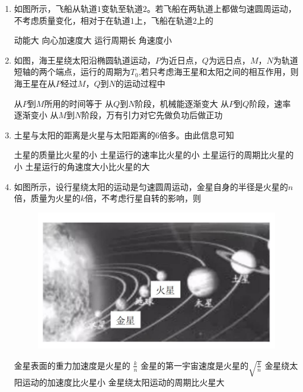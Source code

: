 \begin{enumerate}[leftmargin=0em]
\item 
{}
如图所示，飞船从轨道$ 1 $变轨至轨道$ 2 $。若飞船在两轨道上都做匀速圆周运动，不考虑质量变化，相对于在轨道$ 1 $上，飞船在轨道$ 2 $上的  
\begin{figure}[h!]
\centering

\end{figure}

\fourchoices
{动能大}
{向心加速度大}
{运行周期长}
{角速度小}



\item 
{}
如图，海王星绕太阳沿椭圆轨道运动，$ P $为近日点，$ Q $为远日点，$ M $，$ N $为轨道短轴的两个端点，运行的周期为$ T_{0} $,若只考虑海王星和太阳之间的相互作用，则海王星在从$ P $经过$ M $，$ Q $到$ N $的运动过程中  
\begin{figure}[h!]
\centering

\end{figure}

\fourchoices
{从$ P $到$ M $所用的时间等于}
{从$ Q $到$ N $阶段，机械能逐渐变大}
{从$ P $到$ Q $阶段，速率逐渐变小}
{从$ M $到$ N $阶段，万有引力对它先做负功后做正功}



\item 
{}
土星与太阳的距离是火星与太阳距离的$ 6 $倍多。由此信息可知  

\fourchoices
{土星的质量比火星的小}
{土星运行的速率比火星的小}
{土星运行的周期比火星的小}
{土星运行的角速度大小比火星的大}


\item
{}
如图所示，设行星绕太阳的运动是匀速圆周运动，金星自身的半径是火星的$ n $倍，质量为火星的$ k $倍，不考虑行星自转的影响，则  
\begin{figure}
\centering
\includegraphics[width=0.3\linewidth]{picture/screenshot005}
\end{figure}

\fourchoices
{金星表面的重力加速度是火星的 $\frac { k } { n }$}
{金星的第一宇宙速度是火星的$\sqrt { \frac { k } { n } }$}
{金星绕太阳运动的加速度比火星小}
{金星绕太阳运动的周期比火星大}




\end{enumerate}
